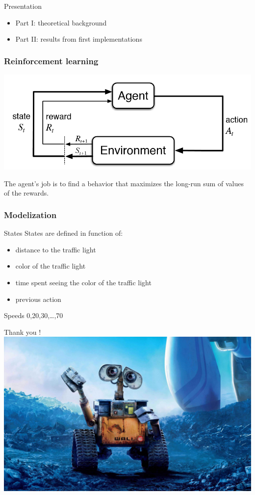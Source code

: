 \documentclass[dvipsnames,svgnames]{beamer}
\begin{document}
\begin{frame}{Presentation}
\begin{block}{}
\begin{itemize}
\item Part I: theoretical background 
\item Part II: results from first implementations
\end{itemize}
\end{block}
\end{frame}

\begin{frame}
\frametitle{Reinforcement learning}
\centering
\includegraphics[scale=0.5]{img/RL_graph.png}
\vspace{1cm}

The agent's job is to find a behavior that maximizes the long-run sum of values of the rewards.
\end{frame}

\begin{frame}
\frametitle{Modelization}
\begin{block}{States}
States are defined in function of:
\begin{itemize}
\item distance to the traffic light
\item color of the traffic light
\item time spent seeing the color of the traffic light 
\item previous action 
\end{itemize}
\end{block}
\begin{block}{Speeds}
0,20,30,\ldots ,70
\end{block}
\end{frame}

\begin{frame}{}
\centering
\Huge{Thank you !} 
\centering
\includegraphics[scale=0.1]{img/walle_end.jpg}
\end{frame}
\end{document}
